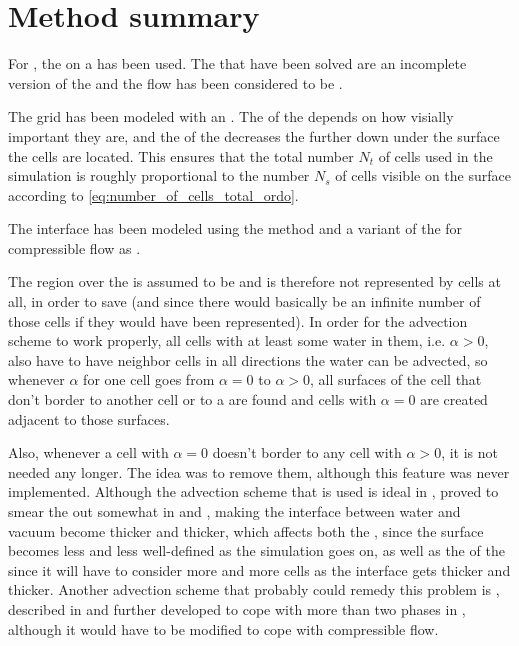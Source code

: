 \chapter{Method summary}

For \thisprojectwork, the \FVM on a  has been used. The \PDEs that have been solved are an incomplete version of the  and the flow has been considered to be .

The grid has been modeled with an \octree. The \LOD of the  depends on how visially important they are, and the \LOD of the  decreases the further down under the surface the cells are located. This  ensures that the total number $N_t$ of cells used in the simulation is roughly proportional to the number $N_s$ of cells visible on the surface according to \eqref{eq:number_of_cells_total_ordo}.

The interface has been modeled using the \VOF method and a variant of the  for compressible flow as .

The region over the  is assumed to be \vacuum and is therefore not represented by cells at all, in order to save  (and since there would basically be an infinite number of those cells if they would have been represented). In order for the advection scheme to work properly, all cells with at least some water in them, i.e. $\alpha > 0$, also have to have neighbor cells in all directions the water can be advected, so whenever $\alpha$ for one cell goes from $\alpha = 0$ to $\alpha > 0$, all surfaces of the cell that don't border to another cell or to a  are found and cells with $\alpha = 0$ are created adjacent to those surfaces.

Also, whenever a cell with $\alpha = 0$ doesn't border to any cell with $\alpha > 0$, it is not needed any longer. The idea was to remove them, although this feature was never implemented. Although the advection scheme that is used is ideal in , proved to smear the  out somewhat in  and , making the interface between water and vacuum become thicker and thicker, which affects both the , since the surface becomes less and less well-defined as the simulation goes on, as well as the \preformance of the  since it will have to consider more and more cells as the interface gets thicker and thicker. Another advection scheme that probably could remedy this problem is \MULES, described in \citep{Berberovi2009} and further developed to cope with more than two phases in \citep{Kissling2010}, although it would have to be modified to cope with compressible flow.

